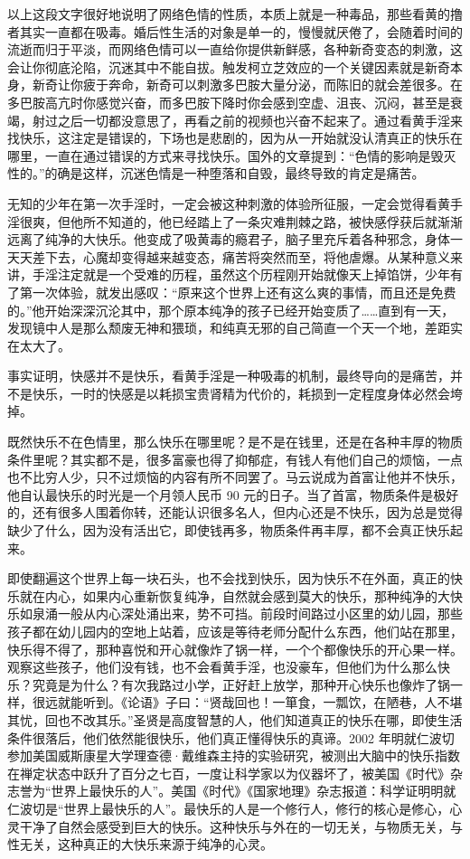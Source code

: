 以上这段文字很好地说明了网络色情的性质，本质上就是一种毒品，那些看黄的撸者其实一直都在吸毒。婚后性生活的对象是单一的，慢慢就厌倦了，会随着时间的流逝而归于平淡，而网络色情可以一直给你提供新鲜感，各种新奇变态的刺激，这会让你彻底沦陷，沉迷其中不能自拔。触发柯立芝效应的一个关键因素就是新奇本身，新奇让你疲于奔命，新奇可以刺激多巴胺大量分泌，而陈旧的就会差很多。在多巴胺高亢时你感觉兴奋，而多巴胺下降时你会感到空虚、沮丧、沉闷，甚至是衰竭，射过之后一切都没意思了，再看之前的视频也兴奋不起来了。通过看黄手淫来找快乐，这注定是错误的，下场也是悲剧的，因为从一开始就没认清真正的快乐在哪里，一直在通过错误的方式来寻找快乐。国外的文章提到：“色情的影响是毁灭性的。”的确是这样，沉迷色情是一种堕落和自毁，最终导致的肯定是痛苦。

无知的少年在第一次手淫时，一定会被这种刺激的体验所征服，一定会觉得看黄手淫很爽，但他所不知道的，他已经踏上了一条灾难荆棘之路，被快感俘获后就渐渐远离了纯净的大快乐。他变成了吸黄毒的瘾君子，脑子里充斥着各种邪念，身体一天天差下去，心魔却变得越来越变态，痛苦将突然而至，将他虐爆。从某种意义来讲，手淫注定就是一个受难的历程，虽然这个历程刚开始就像天上掉馅饼，少年有了第一次体验，就发出感叹：“原来这个世界上还有这么爽的事情，而且还是免费的。”他开始深深沉沦其中，那个原本纯净的孩子已经开始变质了……直到有一天，发现镜中人是那么颓废无神和猥琐，和纯真无邪的自己简直一个天一个地，差距实在太大了。

事实证明，快感并不是快乐，看黄手淫是一种吸毒的机制，最终导向的是痛苦，并不是快乐，一时的快感是以耗损宝贵肾精为代价的，耗损到一定程度身体必然会垮掉。

既然快乐不在色情里，那么快乐在哪里呢？是不是在钱里，还是在各种丰厚的物质条件里呢？其实都不是，很多富豪也得了抑郁症，有钱人有他们自己的烦恼，一点也不比穷人少，只不过烦恼的内容有所不同罢了。马云说成为首富让他并不快乐，他自认最快乐的时光是一个月领人民币 90 元的日子。当了首富，物质条件是极好的，还有很多人围着你转，还能认识很多名人，但内心还是不快乐，因为总是觉得缺少了什么，因为没有活出它，即使钱再多，物质条件再丰厚，都不会真正快乐起来。

即使翻遍这个世界上每一块石头，也不会找到快乐，因为快乐不在外面，真正的快乐就在内心，如果内心重新恢复纯净，自然就会感到莫大的快乐，那种纯净的大快乐如泉涌一般从内心深处涌出来，势不可挡。前段时间路过小区里的幼儿园，那些孩子都在幼儿园内的空地上站着，应该是等待老师分配什么东西，他们站在那里，快乐得不得了，那种喜悦和开心就像炸了锅一样，一个个都像快乐的开心果一样。观察这些孩子，他们没有钱，也不会看黄手淫，也没豪车，但他们为什么那么快乐？究竟是为什么？有次我路过小学，正好赶上放学，那种开心快乐也像炸了锅一样，很远就能听到。《论语》子曰：“贤哉回也！一箪食，一瓢饮，在陋巷，人不堪其忧，回也不改其乐。”圣贤是高度智慧的人，他们知道真正的快乐在哪，即使生活条件很落后，他们依然能很快乐，他们真正懂得快乐的真谛。2002 年明就仁波切参加美国威斯康星大学理查德·戴维森主持的实验研究，被测出大脑中的快乐指数在禅定状态中跃升了百分之七百，一度让科学家以为仪器坏了，被美国《时代》杂志誉为“世界上最快乐的人”。美国《时代》《国家地理》杂志报道：科学证明明就仁波切是“世界上最快乐的人”。最快乐的人是一个修行人，修行的核心是修心，心灵干净了自然会感受到巨大的快乐。这种快乐与外在的一切无关，与物质无关，与性无关，这种真正的大快乐来源于纯净的心灵。

